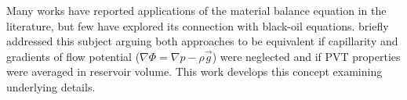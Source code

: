 \documentclass[authoryear,preprint,review,11pt]{elsarticle}
\begin{document}

Many works have reported applications of the material balance equation in the literature, but few have explored its connection with black-oil equations. \cite{ertekin2001basic} briefly addressed this subject arguing both approaches to be equivalent if capillarity and gradients of flow potential ($\nabla \Phi = \nabla p - \rho \vec{g}$) were neglected and if PVT properties were averaged in reservoir volume. This work develops this concept examining underlying details.




\end{document}
